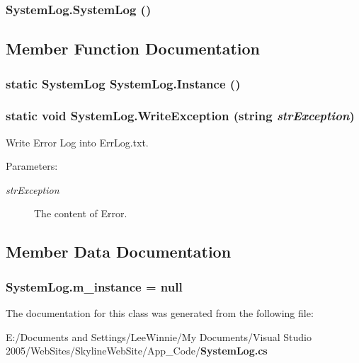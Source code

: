 \subsubsection{\setlength{\rightskip}{0pt plus 5cm}System\-Log.System\-Log ()}\label{class_system_log_34b464465ea413a95865f5eb7e3af41a}




\subsection{Member Function Documentation}
\subsubsection{\setlength{\rightskip}{0pt plus 5cm}static {\bf System\-Log} System\-Log.Instance ()\hspace{0.3cm}{\tt  [static]}}\label{class_system_log_6312dea36684b65445d00a9490de9869}


\subsubsection{\setlength{\rightskip}{0pt plus 5cm}static void System\-Log.Write\-Exception (string {\em str\-Exception})\hspace{0.3cm}{\tt  [static]}}\label{class_system_log_13a7c6c9a3e17b692af31c82416191b0}


Write Error Log into Err\-Log.txt. 

\begin{Desc}
\item[Parameters:]
\begin{description}
\item[{\em str\-Exception}]The content of Error.\end{description}
\end{Desc}


\subsection{Member Data Documentation}
\subsubsection{ {\bf System\-Log.m\_\-instance} = null\hspace{0.3cm}{\tt  [static, private]}}\label{class_system_log_5dd503098e479e061b3e3e3428ff3d5d}




The documentation for this class was generated from the following file:\begin{CompactItemize}
\item 
E:/Documents and Settings/Lee\-Winnie/My Documents/Visual Studio 2005/Web\-Sites/Skyline\-Web\-Site/App\_\-Code/{\bf System\-Log.cs}\end{CompactItemize}
